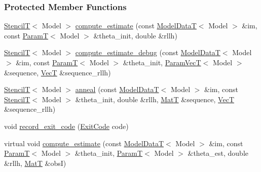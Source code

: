 \subsubsection*{Protected Member Functions}
\begin{DoxyCompactItemize}
\item 
\hyperlink{namespacemappel_a3a06598240007876f8c4bf834ad86197}{StencilT}$<$ Model $>$ \hyperlink{classmappel_1_1SimulatedAnnealingMaximizer_a8a0c6b0ee9c50254b71577ddb191122b}{compute\+\_\+estimate} (const \hyperlink{namespacemappel_a97f050df953605381ae9c901c3b125f1}{Model\+DataT}$<$ Model $>$ \&im, const \hyperlink{namespacemappel_a667925cb0d6c0e49f2f035cc5a9a6857}{ParamT}$<$ Model $>$ \&theta\+\_\+init, double \&rllh)
\item 
\hyperlink{namespacemappel_a3a06598240007876f8c4bf834ad86197}{StencilT}$<$ Model $>$ \hyperlink{classmappel_1_1SimulatedAnnealingMaximizer_a146eedb2f0e4b4a6839c16b288ab7f75}{compute\+\_\+estimate\+\_\+debug} (const \hyperlink{namespacemappel_a97f050df953605381ae9c901c3b125f1}{Model\+DataT}$<$ Model $>$ \&im, const \hyperlink{namespacemappel_a667925cb0d6c0e49f2f035cc5a9a6857}{ParamT}$<$ Model $>$ \&theta\+\_\+init, \hyperlink{namespacemappel_a0f86d3153e4e27b095012f140eea58de}{Param\+VecT}$<$ Model $>$ \&sequence, \hyperlink{namespacemappel_a2225ad69f358daa3f4f99282a35b9a3a}{VecT} \&sequence\+\_\+rllh)
\item 
\hyperlink{namespacemappel_a3a06598240007876f8c4bf834ad86197}{StencilT}$<$ Model $>$ \hyperlink{classmappel_1_1SimulatedAnnealingMaximizer_a90132981350dc35facb8c292493ada74}{anneal} (const \hyperlink{namespacemappel_a97f050df953605381ae9c901c3b125f1}{Model\+DataT}$<$ Model $>$ \&im, const \hyperlink{namespacemappel_a3a06598240007876f8c4bf834ad86197}{StencilT}$<$ Model $>$ \&theta\+\_\+init, double \&rllh, \hyperlink{namespacemappel_a7091ab87c528041f7e2027195fad8915}{MatT} \&sequence, \hyperlink{namespacemappel_a2225ad69f358daa3f4f99282a35b9a3a}{VecT} \&sequence\+\_\+rllh)
\item 
void \hyperlink{classmappel_1_1ThreadedEstimator_a8fefc448211f9caa3612ba4f34b006ab}{record\+\_\+exit\+\_\+code} (\hyperlink{classmappel_1_1Estimator_a6d599915907ba4d0607fcb958d231edc}{Exit\+Code} code)
\item 
virtual void \hyperlink{classmappel_1_1Estimator_aa46d86cfb5c336c9cb8c106da036d7d1}{compute\+\_\+estimate} (const \hyperlink{namespacemappel_a97f050df953605381ae9c901c3b125f1}{Model\+DataT}$<$ Model $>$ \&im, const \hyperlink{namespacemappel_a667925cb0d6c0e49f2f035cc5a9a6857}{ParamT}$<$ Model $>$ \&theta\+\_\+init, \hyperlink{namespacemappel_a667925cb0d6c0e49f2f035cc5a9a6857}{ParamT}$<$ Model $>$ \&theta\+\_\+est, double \&rllh, \hyperlink{namespacemappel_a7091ab87c528041f7e2027195fad8915}{MatT} \&obsI)

\end{DoxyCompactItemize}
